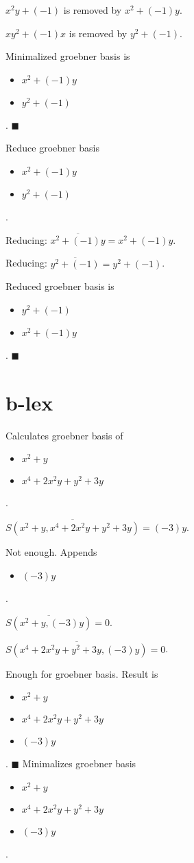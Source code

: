 \documentclass{jsarticle}
\begin{document}
$x^{2}y+(-1)$ is removed by $x^{2}+(-1)y$.  

$xy^{2}+(-1)x$ is removed by $y^{2}+(-1)$.  

Minimalized groebner basis is 
\begin{itemize}
\item $x^{2}+(-1)y$
\item $y^{2}+(-1)$
\end{itemize}  . 
$\blacksquare{}$

Reduce groebner basis 
\begin{itemize}
\item $x^{2}+(-1)y$
\item $y^{2}+(-1)$
\end{itemize}  . 


Reducing: $\overline{x^{2}+(-1)y} = x^{2}+(-1)y$.  

Reducing: $\overline{y^{2}+(-1)} = y^{2}+(-1)$.  

Reduced groebner basis is 
\begin{itemize}
\item $y^{2}+(-1)$
\item $x^{2}+(-1)y$
\end{itemize}  . 
$\blacksquare{}$

\section{b-lex}Calculates groebner basis of 
\begin{itemize}
\item $x^{2}+y$
\item $x^{4}+2x^{2}y+y^{2}+3y$
\end{itemize}  . 


$\overline{S(x^{2}+y, x^{4}+2x^{2}y+y^{2}+3y)} = (-3)y$.  

Not enough.  Appends \begin{itemize}
\item $(-3)y$
\end{itemize}  . 


$\overline{S(x^{2}+y, (-3)y)} = 0$.  

$\overline{S(x^{4}+2x^{2}y+y^{2}+3y, (-3)y)} = 0$.  

Enough for groebner basis.  Result is \begin{itemize}
\item $x^{2}+y$
\item $x^{4}+2x^{2}y+y^{2}+3y$
\item $(-3)y$
\end{itemize}  . 
$\blacksquare{}$
Minimalizes groebner basis 
\begin{itemize}
\item $x^{2}+y$
\item $x^{4}+2x^{2}y+y^{2}+3y$
\item $(-3)y$
\end{itemize}  . 
\end{document}
